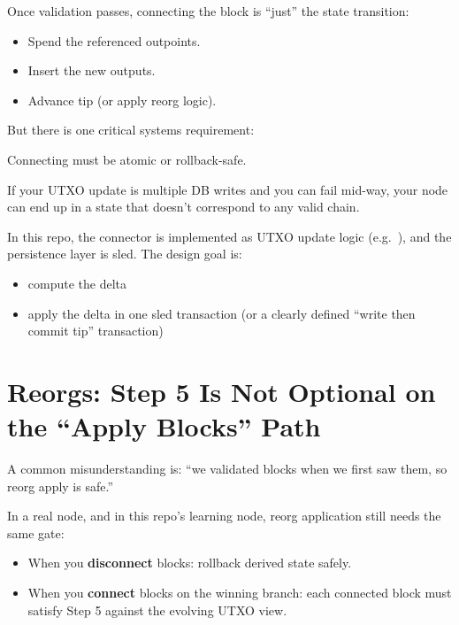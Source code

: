 Once validation passes, connecting the block is ``just'' the state transition:

\begin{itemize}
  \item Spend the referenced outpoints.
  \item Insert the new outputs.
  \item Advance tip (or apply reorg logic).
\end{itemize}

But there is one critical systems requirement:

\begin{warnbox}
Connecting must be atomic or rollback-safe.
\end{warnbox}

If your UTXO update is multiple DB writes and you can fail mid-way, your node can end up in a state that doesn't correspond to any valid chain.

In this repo, the connector is implemented as UTXO update logic (e.g.\ ), and the persistence layer is sled. The design goal is:

\begin{itemize}
  \item compute the delta
  \item apply the delta in one sled transaction (or a clearly defined ``write then commit tip'' transaction)
\end{itemize}

\section{Reorgs: Step 5 Is Not Optional on the ``Apply Blocks'' Path}
\label{sec:ch10-reorgs}

A common misunderstanding is: ``we validated blocks when we first saw them, so reorg apply is safe.''

In a real node, and in this repo's learning node, reorg application still needs the same gate:

\begin{itemize}
  \item When you \textbf{disconnect} blocks: rollback derived state safely.
  \item When you \textbf{connect} blocks on the winning branch: each connected block must satisfy Step 5 against the evolving UTXO view.
\end{itemize}


